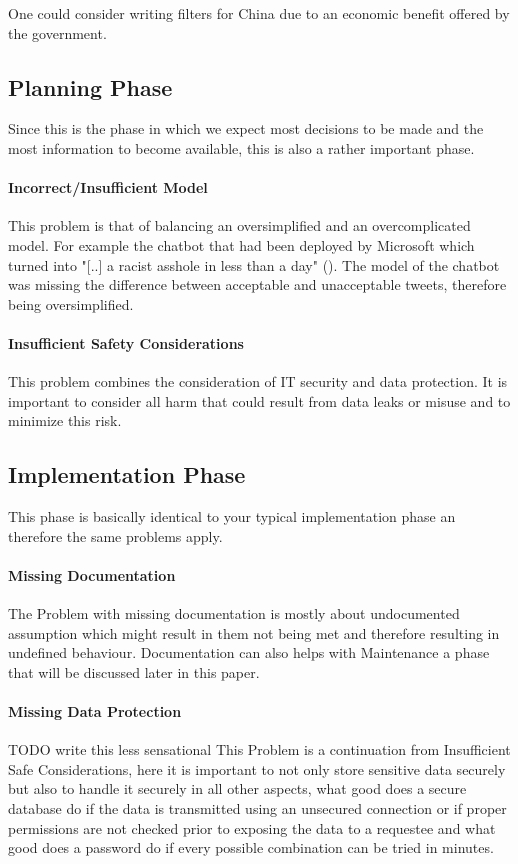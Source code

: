 One could consider writing filters for China due to an economic benefit offered by the government.

\subsection{Planning Phase}
Since this is the phase in which we expect most decisions to be made and 
the most information to become available, this is also a rather important phase.

\paragraph{Incorrect/Insufficient Model}
This problem is that of balancing an oversimplified and an overcomplicated model.
For example the chatbot that had been deployed by Microsoft
 which turned into "[..] a racist asshole in less than a day" (\cite{James2018}). The model of the chatbot was missing 
 the difference between acceptable and unacceptable tweets,
 therefore being oversimplified.
 
\paragraph{Insufficient Safety Considerations}
This problem combines the consideration of IT security and data protection. It is important to consider all harm that could result from data leaks or misuse and to minimize this risk.

\subsection{Implementation Phase}
This phase is basically identical to your typical implementation 
phase an therefore the same problems apply.

\paragraph{Missing Documentation}
The Problem with missing documentation is mostly about undocumented assumption which might result in them not being met
and therefore resulting in undefined behaviour.
Documentation can also helps with Maintenance a phase that will be discussed later in this paper.

\paragraph{Missing Data Protection}
{ \color{red} TODO write this less sensational }
This Problem is a continuation from Insufficient Safe Considerations, here it is important to not only store sensitive data securely but also to handle it securely in all other aspects, what good does a secure database do if the data is transmitted using an unsecured connection or if 
proper permissions are not checked prior to exposing the data to a requestee and what good does a password do if every possible combination can be tried in minutes.

